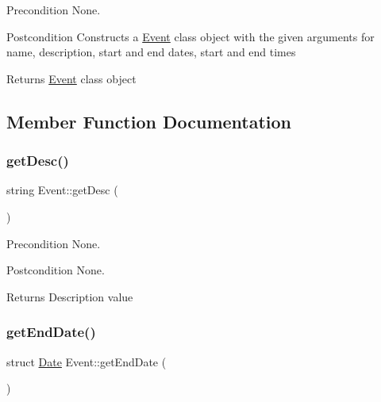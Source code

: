 \begin{DoxyPrecond}{Precondition}
None. 
\end{DoxyPrecond}
\begin{DoxyPostcond}{Postcondition}
Constructs a \hyperlink{class_event}{Event} class object with the given arguments for name, description, start and end dates, start and end times 
\end{DoxyPostcond}
\begin{DoxyReturn}{Returns}
\hyperlink{class_event}{Event} class object 
\end{DoxyReturn}


\subsection{Member Function Documentation}
\hypertarget{class_event_a24238fbbc07f1fa22bf3074be50c87f6}{}\label{class_event_a24238fbbc07f1fa22bf3074be50c87f6} 
\subsubsection{\texorpdfstring{get\+Desc()}{getDesc()}}
{\footnotesize\ttfamily string Event\+::get\+Desc (\begin{DoxyParamCaption}{ }\end{DoxyParamCaption})}

\begin{DoxyPrecond}{Precondition}
None. 
\end{DoxyPrecond}
\begin{DoxyPostcond}{Postcondition}
None. 
\end{DoxyPostcond}
\begin{DoxyReturn}{Returns}
Description value 
\end{DoxyReturn}
\hypertarget{class_event_adde5f5bc15fc96a14611c1b42afd3e10}{}\label{class_event_adde5f5bc15fc96a14611c1b42afd3e10} 
\subsubsection{\texorpdfstring{get\+End\+Date()}{getEndDate()}}
{\footnotesize\ttfamily struct \hyperlink{struct_date}{Date} Event\+::get\+End\+Date (\begin{DoxyParamCaption}{ }\end{DoxyParamCaption})}

